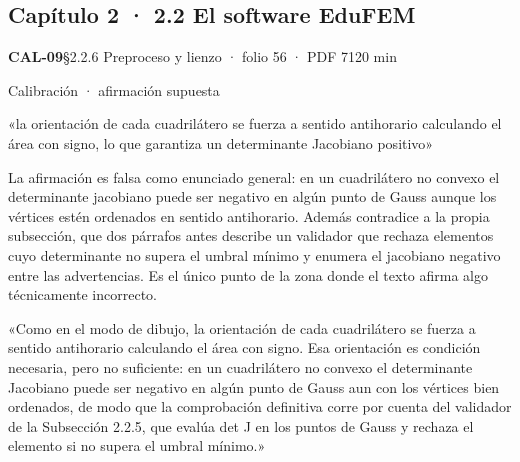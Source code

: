 \subsection{Capítulo 2 · 2.2 El software EduFEM}
\noindent\casilla\textbf{CAL-09}\quad{}\quad §2.2.6 Preproceso y lienzo · folio 56 · PDF 71\hfill 20 min\par\vspace{1pt}
{\small\color{gris}Calibración · afirmación supuesta}\par
\begin{dice}«la orientación de cada cuadrilátero se fuerza a sentido antihorario calculando el área con signo, lo que garantiza un determinante Jacobiano positivo»\end{dice}
{\small{}La afirmación es falsa como enunciado general: en un cuadrilátero no convexo el determinante jacobiano puede ser negativo en algún punto de Gauss aunque los vértices estén ordenados en sentido antihorario. Además contradice a la propia subsección, que dos párrafos antes describe un validador que rechaza elementos cuyo determinante no supera el umbral mínimo y enumera el jacobiano negativo entre las advertencias. Es el único punto de la zona donde el texto afirma algo técnicamente incorrecto.\par}
\begin{debedecir}«Como en el modo de dibujo, la orientación de cada cuadrilátero se fuerza a sentido antihorario calculando el área con signo. Esa orientación es condición necesaria, pero no suficiente: en un cuadrilátero no convexo el determinante Jacobiano puede ser negativo en algún punto de Gauss aun con los vértices bien ordenados, de modo que la comprobación definitiva corre por cuenta del validador de la Subsección 2.2.5, que evalúa det J en los puntos de Gauss y rechaza el elemento si no supera el umbral mínimo.»\end{debedecir}
\vspace{6pt}
